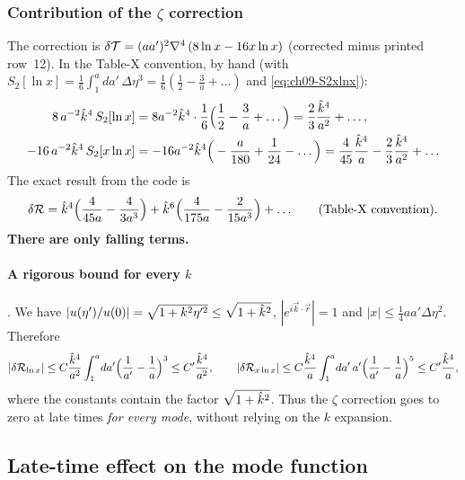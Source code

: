 \subsubsection{Contribution of the \texorpdfstring{$\zeta$}{zeta} correction}
\label{sec:t18-zeta}
The correction is $\delta\mathcal{T}=(aa')^2\nabla^4\,(8\ln x-16x\ln x)$ (corrected minus printed row~12). In the Table-X convention, by hand \tD{}
(with $S_2[\ln x]=\tfrac16\int_1^ada'\,\Delta\eta^3=\tfrac16(\tfrac12-\tfrac3a+\ldots)$ and \eqref{eq:ch09-S2xlnx}):
\begin{equation}
\begin{aligned}
8\,a^{-2}\hat k^4\,S_2[\ln x]&=8a^{-2}\hat k^4\cdot\frac16\Big(\frac12-\frac3a+\ldots\Big)=\frac23\frac{\hat k^4}{a^2}+\ldots,\\
-16\,a^{-2}\hat k^4\,S_2[x\ln x]&=-16a^{-2}\hat k^4\Big(-\frac a{180}+\frac1{24}-\ldots\Big)=\frac4{45}\frac{\hat k^4}a-\frac23\frac{\hat k^4}{a^2}+\ldots
\end{aligned}
\label{eq:ch09-zetahand}
\end{equation}
The exact result from the code \tC{} is
\begin{equation}
\delta\mathcal{R}=\hat k^4\Big(\frac4{45a}-\frac4{3a^3}\Big)+\hat k^6\Big(\frac{4}{175a}-\frac{2}{15a^3}\Big)+\ldots\qquad\text{(Table-X convention)}.
\label{eq:ch09-zetacode}
\end{equation}
\textbf{There are only falling terms.}

\paragraph{A rigorous bound for every $k$} \tD. We have $|u(\eta')/u(0)|=\sqrt{1+k^2\eta'^2}\le\sqrt{1+\hat k^2}$, $|e^{i\vec k\cdot\vec r}|=1$ and $|x|\le\tfrac14aa'\Delta\eta^2$. Therefore
\begin{equation}
|\delta\mathcal{R}_{\ln x}|\le C\frac{\hat k^4}{a^2}\int_1^a\!da'\Big(\frac1{a'}-\frac1a\Big)^3\le C'\frac{\hat k^4}{a^2},\qquad
|\delta\mathcal{R}_{x\ln x}|\le C\frac{\hat k^4}{a}\int_1^a\!da'\,a'\Big(\frac1{a'}-\frac1a\Big)^5\le C'\frac{\hat k^4}{a},
\label{eq:ch09-bound}
\end{equation}
where the constants contain the factor $\sqrt{1+\hat k^2}$. Thus the $\zeta$ correction goes to zero at late times \emph{for every mode}, without relying on the $k$ expansion.

\subsection{Late-time effect on the mode function}
\label{sec:t18-late}

